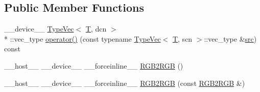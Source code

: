 \subsection*{Public Member Functions}
\begin{DoxyCompactItemize}
\item 
\-\_\-\-\_\-device\-\_\-\-\_\- \hyperlink{structcv_1_1gpu_1_1device_1_1TypeVec}{Type\-Vec}$<$ \hyperlink{calib3d_8hpp_a3efb9551a871ddd0463079a808916717}{T}, dcn $>$\\*
\-::vec\-\_\-type \hyperlink{structcv_1_1gpu_1_1device_1_1color__detail_1_1RGB2RGB_a8852b6063e82827f8793fa42b06c9a68}{operator()} (const typename \hyperlink{structcv_1_1gpu_1_1device_1_1TypeVec}{Type\-Vec}$<$ \hyperlink{calib3d_8hpp_a3efb9551a871ddd0463079a808916717}{T}, scn $>$\-::vec\-\_\-type \&\hyperlink{legacy_8hpp_a371cd109b74033bc4366f584edd3dacc}{src}) const 
\item 
\-\_\-\-\_\-host\-\_\-\-\_\- \-\_\-\-\_\-device\-\_\-\-\_\- \-\_\-\-\_\-forceinline\-\_\-\-\_\- \hyperlink{structcv_1_1gpu_1_1device_1_1color__detail_1_1RGB2RGB_a9c319a04298ca384b3ed630a772d3e60}{R\-G\-B2\-R\-G\-B} ()
\item 
\-\_\-\-\_\-host\-\_\-\-\_\- \-\_\-\-\_\-device\-\_\-\-\_\- \-\_\-\-\_\-forceinline\-\_\-\-\_\- \hyperlink{structcv_1_1gpu_1_1device_1_1color__detail_1_1RGB2RGB_af608d18bb67e23cc644f5103ed8deddf}{R\-G\-B2\-R\-G\-B} (const \hyperlink{structcv_1_1gpu_1_1device_1_1color__detail_1_1RGB2RGB}{R\-G\-B2\-R\-G\-B} \&)
\end{DoxyCompactItemize}


